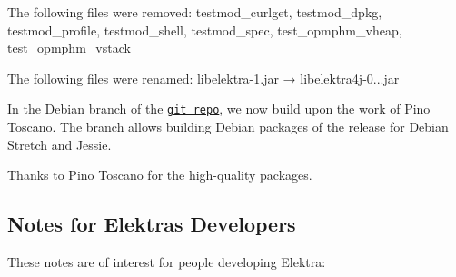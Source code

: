 The following files were removed\+: {\ttfamily testmod\+\_\+curlget}, {\ttfamily testmod\+\_\+dpkg}, {\ttfamily testmod\+\_\+profile}, {\ttfamily testmod\+\_\+shell}, {\ttfamily testmod\+\_\+spec}, {\ttfamily test\+\_\+opmphm\+\_\+vheap}, {\ttfamily test\+\_\+opmphm\+\_\+vstack}

The following files were renamed\+: {\ttfamily libelektra-\/1.\+jar} → {\ttfamily libelektra4j-\/0...\+jar}

In the Debian branch of the \href{https://git.libelektra.org/tree/debian}{\tt git repo}, we now build upon the work of Pino Toscano. The branch allows building Debian packages of the release for Debian Stretch and Jessie.

Thanks to Pino Toscano for the high-\/quality packages.

\subsection*{Notes for Elektra\textquotesingle{}s Developers}

These notes are of interest for people developing Elektra\+:


